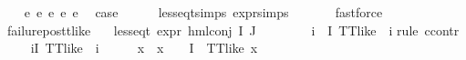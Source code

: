 \begin{isabellebody}
\ \ \isamarkupfalse%
\ e{}\ e{}\ e{}\ e{}\ e{}\ \isamarkupfalse%
\ {\isacharquery}{\kern0pt}case\isanewline
\ \ \ \ \isamarkupfalse%
\ less{\isacharunderscore}{\kern0pt}eq{\isacharunderscore}{\kern0pt}t{\isachardot}{\kern0pt}simps\ expr{\isachardot}{\kern0pt}simps\ \isanewline
\ \ \ \ \isamarkupfalse%
\ fastforce\isanewline
{}\isamarkupfalse%
%
\endisatagproof
{\isafoldproof}%
%
\isadelimproof
\isanewline
%
\endisadelimproof
\isanewline
{}\isamarkupfalse%
\ failure{\isacharunderscore}{\kern0pt}pos{\isacharunderscore}{\kern0pt}tt{\isacharunderscore}{\kern0pt}like{\isacharcolon}{\kern0pt}\isanewline
\ \ \ {\isachardoublequoteopen}less{\isacharunderscore}{\kern0pt}eq{\isacharunderscore}{\kern0pt}t\ {\isacharparenleft}{\kern0pt}expr\ {\isacharparenleft}{\kern0pt}hml{\isacharunderscore}{\kern0pt}conj\ I\ J\ {\isasymPhi}{\isacharparenright}{\kern0pt}{\isacharparenright}{\kern0pt}\ {\isacharparenleft}{\kern0pt}{\isasyminfinity}{\isacharcomma}{\kern0pt}\ {}{\isacharcomma}{\kern0pt}\ {}{\isacharcomma}{\kern0pt}\ {}{\isacharcomma}{\kern0pt}\ {}{\isacharcomma}{\kern0pt}\ {}{\isacharparenright}{\kern0pt}{\isachardoublequoteclose}\isanewline
{}\ {\isachardoublequoteopen}{\isacharparenleft}{\kern0pt}{\isasymforall}i\ {\isasymin}\ I{\isachardot}{\kern0pt}\ TT{\isacharunderscore}{\kern0pt}like\ {\isacharparenleft}{\kern0pt}{\isasymPhi}\ i{\isacharparenright}{\kern0pt}{\isacharparenright}{\kern0pt}{\isachardoublequoteclose}\isanewline
%
\isadelimproof
%
\endisadelimproof
%
\isatagproof
{}\isamarkupfalse%
{\isacharparenleft}{\kern0pt}rule\ ccontr{\isacharparenright}{\kern0pt}\isanewline
\ \ \isamarkupfalse%
\ {\isachardoublequoteopen}{\isasymnot}\ {\isacharparenleft}{\kern0pt}{\isasymforall}i{\isasymin}I{\isachardot}{\kern0pt}\ TT{\isacharunderscore}{\kern0pt}like\ {\isacharparenleft}{\kern0pt}{\isasymPhi}\ i{\isacharparenright}{\kern0pt}{\isacharparenright}{\kern0pt}{\isachardoublequoteclose}\isanewline
\ \ \isamarkupfalse%
\ \isamarkupfalse%
\ x\ \ {\isachardoublequoteopen}x\ {\isasymin}\ {\isacharparenleft}{\kern0pt}{\isasymPhi}\ {\isacharbackquote}{\kern0pt}\ I{\isacharparenright}{\kern0pt}{\isachardoublequoteclose}\ {\isachardoublequoteopen}{\isasymnot}\ TT{\isacharunderscore}{\kern0pt}like\ x{\isachardoublequoteclose}\isanewline
\ \ \ \ \isamarkupfalse%

\end{isabellebody}
